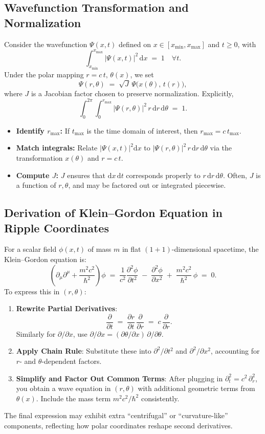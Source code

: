 \documentclass[11pt]{article}
\begin{document}
\subsection{Wavefunction Transformation and Normalization}
\label{app:sec:wavefunction-norm}
Consider the wavefunction $\Psi(x,t)$ defined on $x\in[x_{\min},x_{\max}]$ 
and $t\ge0$, with
\[
  \int_{x_{\min}}^{x_{\max}} |\Psi(x,t)|^2 \,\mathrm{d}x \;=\; 1 \quad \forall t.
\]
Under the polar mapping $r=c\,t,\, \theta(x)$, we set
\[
  \Psi(r,\theta) \;=\; \sqrt{J}\,\Psi\bigl(x(\theta),\,t(r)\bigr),
\]
where $J$ is a Jacobian factor chosen to preserve normalization. Explicitly,
\[
  \int_0^{2\pi} \int_0^{r_{\max}} |\Psi(r,\theta)|^2 
  \,r\,\mathrm{d}r\,\mathrm{d}\theta \;=\; 1.
\]
\begin{itemize}
  \item \textbf{Identify $r_{\max}$:}
    If $t_{\max}$ is the time domain of interest, then $r_{\max} = c\,t_{\max}$.
  \item \textbf{Match integrals:}
    Relate $|\Psi(x,t)|^2\mathrm{d}x$ to $|\Psi(r,\theta)|^2\,r\,\mathrm{d}r\,\mathrm{d}\theta$ 
    via the transformation $x(\theta)$ and $r=c\,t$.
  \item \textbf{Compute $J$:}
    $J$ ensures that $\mathrm{d}x\,\mathrm{d}t$ corresponds properly to 
    $r\,\mathrm{d}r\,\mathrm{d}\theta$. Often, $J$ is a function of $r,\theta$, 
    and may be factored out or integrated piecewise.
\end{itemize}

\subsection{Derivation of Klein--Gordon Equation in Ripple Coordinates}
\label{app:sec:KG-derivation}
For a scalar field $\phi(x,t)$ of mass $m$ in flat $(1+1)$-dimensional spacetime, 
the Klein--Gordon equation is:
\[
  \left(\partial_\mu\partial^\mu + \frac{m^2c^2}{\hbar^2}\right)\phi \;=\; 
  \frac{1}{c^2}\frac{\partial^2 \phi}{\partial t^2} \;-\;\frac{\partial^2 \phi}{\partial x^2}
  \;+\;\frac{m^2 c^2}{\hbar^2}\,\phi \;=\; 0.
\]
To express this in $(r,\theta)$:
\begin{enumerate}
  \item \textbf{Rewrite Partial Derivatives}: 
    \[
      \frac{\partial}{\partial t} 
      \;=\; \frac{\partial r}{\partial t}\,\frac{\partial}{\partial r} 
      \;=\; c\,\frac{\partial}{\partial r}.
    \]
    Similarly for $\partial/\partial x$, use 
    \(\partial/\partial x = (\partial\theta/\partial x)\,\partial/\partial \theta\).
  \item \textbf{Apply Chain Rule}: 
    Substitute these into $\partial^2/\partial t^2$ and $\partial^2/\partial x^2$, 
    accounting for $r$- and $\theta$-dependent factors.
  \item \textbf{Simplify and Factor Out Common Terms}: 
    After plugging in $\partial_t^2 = c^2\,\partial_r^2$, you obtain a wave equation 
    in $(r,\theta)$ with additional geometric terms from $\theta(x)$. 
    Include the mass term $m^2c^2/\hbar^2$ consistently.
\end{enumerate}
The final expression may exhibit extra “centrifugal” or “curvature-like” components, 
reflecting how polar coordinates reshape second derivatives.
\end{document}
